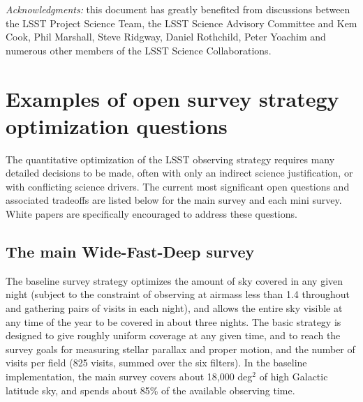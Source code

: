 \documentclass[DM,lsstdraft,toc,usenatbib]{lsstdoc}
\begin{document}
\vskip 0.2in 
{\it Acknowledgments:} this document has greatly benefited from discussions between 
the LSST Project Science Team, the LSST Science Advisory Committee and Kem Cook, 
Phil Marshall, Steve Ridgway, Daniel Rothchild, Peter Yoachim and numerous other members 
of the LSST Science Collaborations. 

\newpage
\appendix
\section{Examples of open survey strategy optimization questions} 

The quantitative optimization of the LSST observing strategy requires many 
detailed decisions to be made, often with only an indirect science justification,
or with conflicting science drivers.  The current most significant open questions and associated 
tradeoffs are listed below for the main survey and each mini survey. White papers are specifically 
encouraged to address these questions.


\subsection{The main Wide-Fast-Deep survey} 

The baseline survey strategy optimizes the amount of sky covered in any given night (subject to 
the constraint of observing at airmass less than 1.4 throughout and gathering pairs of visits in each night), and allows the entire sky 
visible at any time of the year to be covered in about three nights. The basic strategy is designed 
to give roughly uniform coverage at any given time, and to reach the survey goals for measuring 
stellar parallax and proper motion, and the number of visits per field (825 visits, summed over the 
six filters). In the baseline implementation, the main survey covers about 18,000 deg$^2$ of 
high Galactic latitude sky, and spends about 85\% of the available observing time. 
\end{document}
